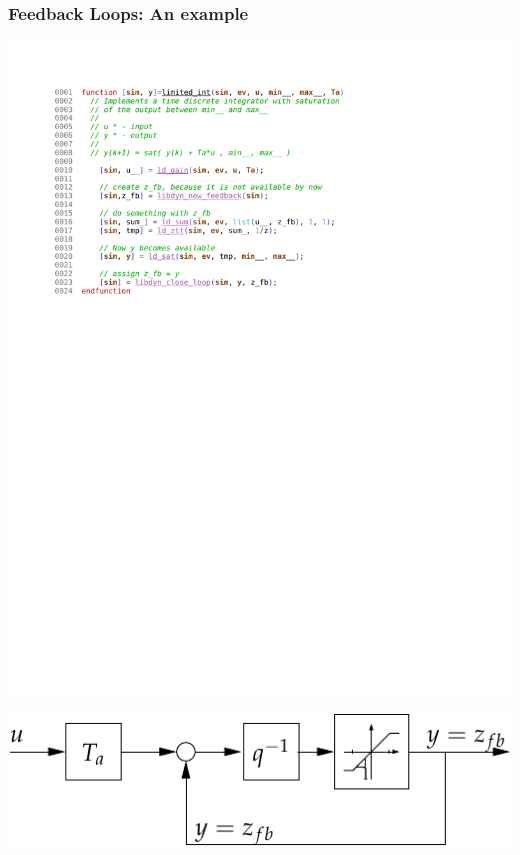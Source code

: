 \documentclass[serif,9pt,xcolor=dvipsnames]{beamer}
\begin{document}
\begin{frame}[fragile]
 \frametitle{Feedback Loops: An example}



\centering \includegraphics[trim=3cm 16.5cm 4cm 1cm, clip, width=0.8\linewidth]{figures/limited_int.pdf} 

\centering \includegraphics[width=0.6\linewidth]{figures/ld_limited_int_block.pdf} 


\end{frame}
\end{document}
